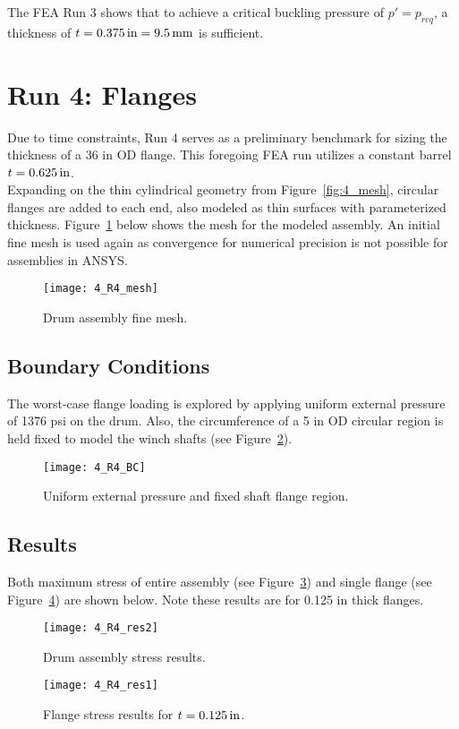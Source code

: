 The FEA Run 3 shows that to achieve a critical buckling pressure of $p'=p_{req}$, a thickness of $t=0.375\,\mathrm{in}=9.5\,\mathrm{mm}$ is sufficient.

\section{Run 4: Flanges}
\label{section:4_R4}
Due to time constraints, Run 4 serves as a preliminary benchmark for sizing the thickness of a 36 in OD flange. This foregoing FEA run utilizes a constant barrel $t=0.625\,\mathrm{in}$.\\

Expanding on the thin cylindrical geometry from Figure~\ref{fig:4_mesh}, circular flanges are added to each end, also modeled as thin surfaces with parameterized thickness. Figure~\ref{fig:4_R4_mesh} below shows the mesh for the modeled assembly. An initial fine mesh  is used again as convergence for numerical precision is not possible for assemblies in ANSYS.
\begin{figure}[H]
	\centering
	\texttt{[image: 4\_R4\_mesh]}
	\caption{Drum assembly fine mesh.}
	\label{fig:4_R4_mesh}
\end{figure}

\subsection{Boundary Conditions}

The worst-case flange loading is explored by applying uniform external pressure of 1376 psi on the drum. Also, the circumference of a 5 in OD circular region is held fixed to model the winch shafts (see Figure~\ref{fig:4_R4_BC}).
\begin{figure}[H]
	\centering
	\texttt{[image: 4\_R4\_BC]}
	\caption{Uniform external pressure and fixed shaft flange region.}
	\label{fig:4_R4_BC}
\end{figure}

\subsection{Results}

Both maximum stress of entire assembly (see Figure~\ref{fig:4_R4_res2}) and single flange (see Figure~\ref{fig:4_R4_res1}) are shown below. Note these results are for 0.125 in thick flanges.

\begin{figure}[H]
	\centering
	\texttt{[image: 4\_R4\_res2]}
	\caption{Drum assembly stress results.}
	\label{fig:4_R4_res2}
\end{figure}
\begin{figure}[H]
	\centering
	\texttt{[image: 4\_R4\_res1]}
	\caption{Flange stress results for $t=0.125 \,\mathrm{in}$.}
	\label{fig:4_R4_res1}
\end{figure}


